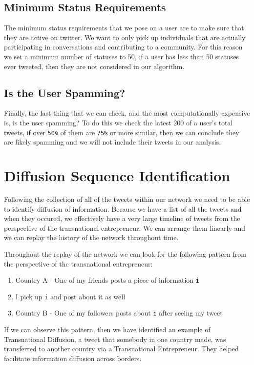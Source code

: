\subsection{Minimum Status Requirements}
The minimum status requirements that we pose on a user are to make
sure that they are active on twitter. We want to only pick up
individuals that are actually participating in conversations and
contributing to a community. For this reason we set a minimum number
of statuses to 50, if a user has less than 50 statuses ever tweeted,
then they are not considered in our algorithm.

\subsection{Is the User Spamming?}
Finally, the last thing that we can check, and the most
computationally expensive is, is the user spamming? To do this we
check the latest 200 of a user's total tweets, if over \verb|50%| of
them are \verb|75%| or more similar, then we can conclude they are
likely spamming and we will not include their tweets in our analysis.

\section{Diffusion Sequence Identification}
Following the collection of all of the tweets within our network we
need to be able to identify diffusion of information. Because we have
a list of all the tweets and when they occured, we effectively have a
very large timeline of tweets from the perspective of the
transnational entrepreneur. We can arrange them linearly and we can
replay the history of the network throughout time.

Throughout the replay of the network we can look for the following
pattern from the perspective of the transnational entrepreneur:

\begin{enumerate}
\item Country A - One of my friends posts a piece of information \verb|i| 
\item I pick up \verb|i| and post about it as well
\item Country B - One of my followers posts about \verb|i| after seeing my tweet
\end{enumerate}

If we can observe this pattern, then we have identified an example of
Transnational Diffusion, a tweet that somebody in one country made,
was transferred to another country via a Transnational
Entrepreneur. They helped facilitate information diffusion across
borders.


